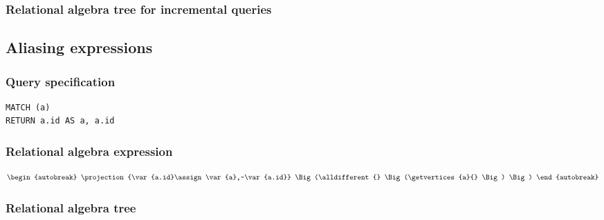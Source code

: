 
\subsubsection*{Relational algebra tree for incremental queries}


\subsection{Aliasing expressions}

\subsubsection*{Query specification}

\begin{lstlisting}
MATCH (a)
RETURN a.id AS a, a.id
\end{lstlisting}

\subsubsection*{Relational algebra expression}

\begin{align*}
\begin{autobreak}
\projection{\var{a.id}\assign \var{a},~\var{a.id}} \Big(\alldifferent{} \Big(\getvertices{a}{}
\Big)
\Big)
\end{autobreak}
\end{align*}

\subsubsection*{Relational algebra tree}


